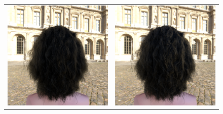 \documentclass[11pt,a4paper]{report}
\begin{document}
\begin{figure}[h]
\begin{center}
\begin{tabular}{cc}
\includegraphics[scale=0.16]{realworld/venice/deon_black1_32.png} &
\includegraphics[scale=0.16]{realworld/venice/uniform_black1_32.png} \\

\end{tabular}
\end{center}
\end{figure}
\end{document}
